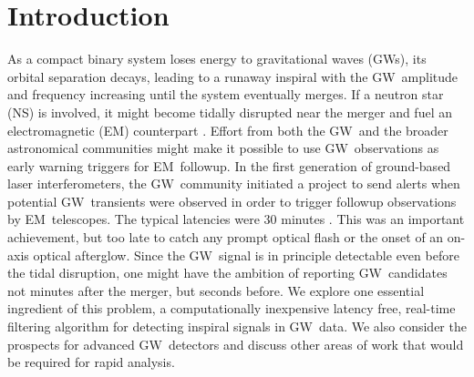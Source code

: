 \documentclass[preprint2]{aastex}
\newcommand{\NS}{NS}
\newcommand{\GW}{GW}%
\newcommand{\EM}{EM}%
\begin{document}
\section{Introduction}

As a compact binary system loses energy to gravitational waves (\GW{}s), its
orbital separation decays, leading to a runaway inspiral with the \GW\
amplitude and frequency increasing until the system eventually merges.  If a
neutron star (\NS) is involved, it might become tidally disrupted near the
merger and fuel an electromagnetic (\EM) counterpart \citep{shibata:2007}.
Effort from both the \GW\ and the broader astronomical communities might make
it possible to use \GW\ observations as early warning triggers for \EM\
followup. In the first generation of ground-based laser interferometers, the
\GW\ community initiated a project to send alerts when potential \GW\
transients were observed in order to trigger followup observations by \EM\
telescopes.  The typical latencies were 30 minutes \citep{HugheyGWPAW2011}.
This was an important achievement, but too late to catch any prompt optical flash
or the onset of an on-axis optical afterglow.  Since the \GW\ signal is in principle detectable even before the tidal
disruption, one might have the ambition of reporting \GW\ candidates not minutes
after the merger, but seconds before.  We explore one essential ingredient of
this problem, a computationally inexpensive latency free, real-time filtering
algorithm for detecting inspiral signals in \GW\ data.  We also consider the
prospects for advanced \GW\ detectors and discuss other areas of work that would
be required for rapid analysis.
\end{document}
